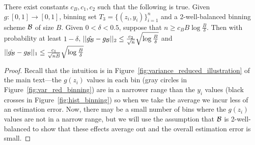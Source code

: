 \begin{lemma}
\label{thm:empirical-binning}
There exist constants $c_B, c_1, c_2$ such that the following is true. Given $g : [0, 1] \to [0, 1]$, binning set $T_3 = \{(z_i, y_i)\}_{i=1}^n$ and a 2-well-balanced binning scheme $\mathcal{B}{}$ of size $B$. Given $0 < \delta < 0.5$, suppose that $n \geq c_B B\log{\frac{B}{\delta}}$. Then with probability at least $1 - \delta$,  $||\hat{g_{\mathcal{B}{}}} - g_{\mathcal{B}{}}||_2 \leq \frac{c_2}{\sqrt{n}}\sqrt{\log{\frac{B}{\delta}}}$ and $||\hat{g_{\mathcal{B}{}}} - g_{\mathcal{B}{}}||_1 \leq \frac{c_1}{\sqrt{nB}}\sqrt{\log{\frac{B}{\delta}}}$
\end{lemma}

\begin{proof}

Recall that the intuition is in Figure~\ref{fig:variance_reduced_illustration} of the main text---the $g(z_i)$ values in each bin (gray circles in Figure~\ref{fig:var_red_binning}) are in a narrower range than the $y_i$ values (black crosses in Figure~\ref{fig:hist_binning}) so when we take the average we incur less of an estimation error. Now, there may be a small number of bins where the $g(z_i)$ values are not in a narrow range, but we will use the assumption that $\mathcal{B}{}$ is 2-well-balanced to show that these effects average out and the overall estimation error is small.


\end{proof}
